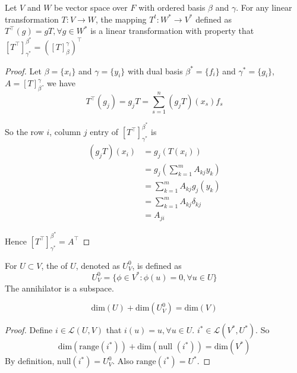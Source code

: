 \begin{theorem}
	Let $V$ and $W$ be vector space over $F$ with ordered basis $\beta$ and $\gamma$. For any linear transformation $T:V \rightarrow W$, the mapping $T^t: W^* \rightarrow V^*$ defined as $T^\top (g) = gT, \forall g \in W^*$ is a linear transformation with property that $[T^\top]_{\gamma^*}^{\beta^*} = ([T]_\beta^\gamma)^\top$
\end{theorem}
\begin{proof}
	Let $\beta = \{x_i\}$ and $\gamma=\{y_i\}$ with dual basis $\beta^*=\{f_i\}$ and $\gamma^*=\{g_i\}$, $A=[T]_\beta^\gamma$. we have
	\begin{equation*}
		T^\top (g_j) = g_j T = \sum_{s=1}^n (g_j T) (x_s) f_s
	\end{equation*}
	
	So the row $i$, column $j$ entry of $[T^\top]_{\gamma^*}^{\beta^*}$ is
	\begin{equation*}
		\begin{aligned}
			(g_j T)(x_i) &= g_j (T(x_i)) \\
			&= g_j \left( \sum_{k=1}^m A_{kj} y_k \right) \\
			&= \sum_{k=1}^m A_{kj} g_j(y_k) \\
			&= \sum_{k=1}^m A_{kj} \delta_{kj} \\
			&= A_{ji}
		\end{aligned}
	\end{equation*}
	
	Hence $[T^\top]_{\gamma^*}^{\beta^*} = A^\top $
\end{proof}

\begin{definition}
    For $U \subset V$, the  of $U$, denoted as $U^0_V$, is defined as
    \begin{equation*}
        U^0_V = \{ \phi \in V^*: \phi(u) = 0, \forall u \in U \}
    \end{equation*}
    The annihilator is a subspace.
\end{definition}

\begin{theorem}
    \begin{equation}
        \text{dim}(U) + \text{dim}(U_V^0) = \text{dim}(V)
    \end{equation}
\end{theorem}

\begin{proof}
    Define $i \in \mathcal{L}(U,V)$ that $i(u) = u, \forall u \in U$. $i^* \in \mathcal{L}(V^*,U^*)$. So
    \begin{equation*}
        \text{dim}(\text{range}(i^*)) + \text{dim}(\text{null } (i^*)) = \text{dim}(V^*)
    \end{equation*}
    By definition, $\text{null}(i^*) = U^0_V$. Also $\text{range}(i^*) = U^*$.
\end{proof}


